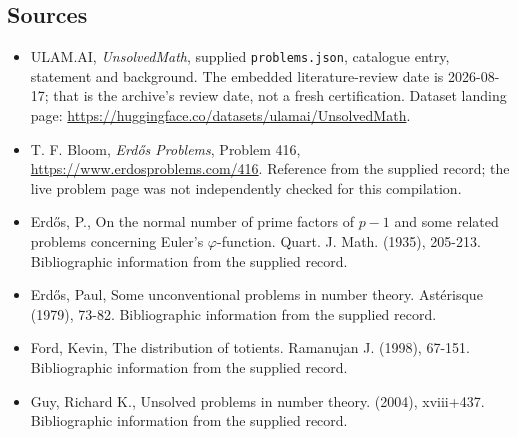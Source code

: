 \documentclass[11pt,a4paper]{article}
\begin{document}
\subsection{Sources}

{\small

\begin{itemize}

\item[\hypertarget{source:statement:1}{S1}] ULAM.AI, \emph{UnsolvedMath}, supplied \texttt{problems.json}, catalogue entry, statement and background. The embedded literature-review date is 2026-08-17; that is the archive’s review date, not a fresh certification. Dataset landing page: \url{https://huggingface.co/datasets/ulamai/UnsolvedMath}.

\item[\hypertarget{source:statement:2}{S2}] T. F. Bloom, \emph{Erdős Problems}, Problem 416, \url{https://www.erdosproblems.com/416}. Reference from the supplied record; the live problem page was not independently checked for this compilation.

\item[\hypertarget{source:statement:3}{S3}] Erd\H{o}s, P., On the normal number of prime factors of $p-1$ and some related problems concerning Euler's $\varphi$-function. Quart. J. Math. (1935), 205-213. Bibliographic information from the supplied record.

\item[\hypertarget{source:statement:4}{S4}] Erd\H{o}s, Paul, Some unconventional problems in number theory. Ast\'{e}risque (1979), 73-82. Bibliographic information from the supplied record.

\item[\hypertarget{source:statement:5}{S5}] Ford, Kevin, The distribution of totients. Ramanujan J. (1998), 67-151. Bibliographic information from the supplied record.

\item[\hypertarget{source:statement:6}{S6}] Guy, Richard K., Unsolved problems in number theory. (2004), xviii+437. Bibliographic information from the supplied record.

\end{itemize}

}

\label{end:statement}
\end{document}
